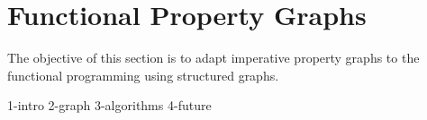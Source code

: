 \section{Functional Property Graphs}
\label{sec:work}

The objective of this section is to adapt imperative property graphs to the functional programming
using structured graphs.

{1-intro}
{2-graph}
{3-algorithms}
{4-future}
